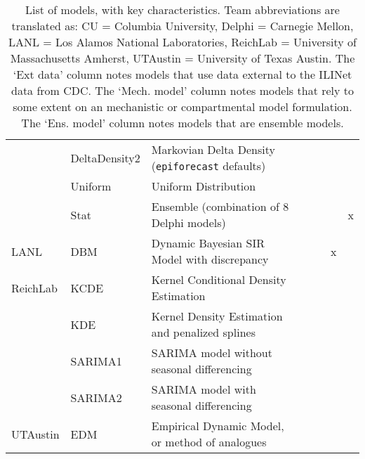 \begin{table}
\begin{tabular}{p{1.6cm} l p{7.5cm} l  p{1cm}  p{1cm} p{1cm}}
~        & DeltaDensity2      & Markovian Delta Density ({\tt epiforecast} defaults)& \cite{Brooks2015a} & ~             & ~          &          \\ 
~        & Uniform            & Uniform Distribution&  & ~             & ~   &                 \\ 
~        & Stat               & Ensemble (combination of 8 Delphi models)& & ~             & ~  & x                 \\
\hline
LANL     & DBM                & Dynamic Bayesian SIR Model with discrepancy & \cite{Osthus2017} & ~             & x      &              \\ 
\hline
ReichLab & KCDE               & Kernel Conditional Density Estimation & \cite{Ray2017}  & ~             & ~            &        \\ 
~        & KDE                & Kernel Density Estimation and penalized splines & \cite{Ray2018}  & ~             & ~     &               \\ 
~        & SARIMA1            & SARIMA model without seasonal differencing & \cite{Ray2018} & ~             & ~      &              \\ 
~        & SARIMA2            & SARIMA model with seasonal differencing & \cite{Ray2018} & ~             & ~           &         \\ 
\hline
UTAustin & EDM                & Empirical Dynamic Model, or method of analogues & \cite{Sugihara1990} & ~             & ~         &           \\ 
\end{tabular}
\caption{List of models, with key characteristics. Team abbreviations are translated as: CU = Columbia University, Delphi = Carnegie Mellon, LANL = Los Alamos National Laboratories, ReichLab = University of Massachusetts Amherst, UTAustin = University of Texas Austin.  The `Ext data' column notes models that use data external to the ILINet data from CDC. The `Mech. model' column notes models that rely to some extent on an mechanistic or compartmental model formulation. The `Ens. model' column notes models that are ensemble models.}
\label{tab:model-list}
\end{table}